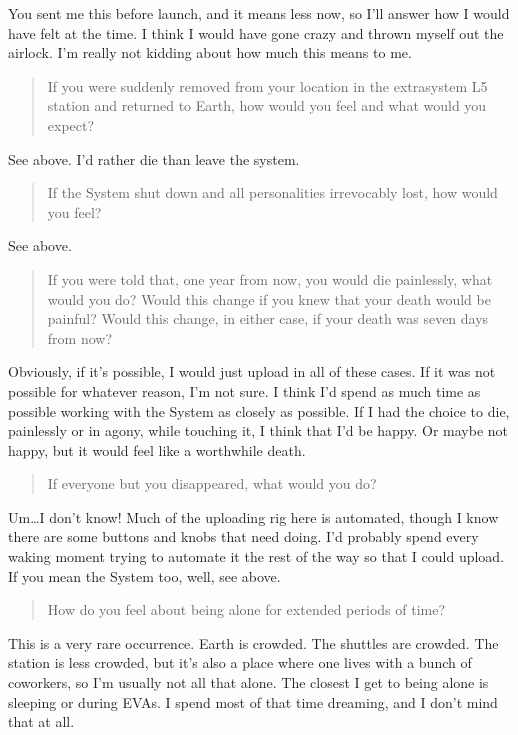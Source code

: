 You sent me this before launch, and it means less now, so I'll answer how I would have felt at the time. I think I would have gone crazy and thrown myself out the airlock. I'm really not kidding about how much this means to me.

\begin{quote}
If you were suddenly removed from your location in the extrasystem L5 station and returned to Earth, how would you feel and what would you expect?
\end{quote}

See above. I'd rather die than leave the system.

\begin{quote}
If the System shut down and all personalities irrevocably lost, how would you feel?
\end{quote}

See above.

\begin{quote}
If you were told that, one year from now, you would die painlessly, what would you do? Would this change if you knew that your death would be painful? Would this change, in either case, if your death was seven days from now?
\end{quote}

Obviously, if it's possible, I would just upload in all of these cases. If it was not possible for whatever reason, I'm not sure. I think I'd spend as much time as possible working with the System as closely as possible. If I had the choice to die, painlessly or in agony, while touching it, I think that I'd be happy. Or maybe not happy, but it would feel like a worthwhile death.

\begin{quote}
If everyone but you disappeared, what would you do?
\end{quote}

Um\ldots I don't know! Much of the uploading rig here is automated, though I know there are some buttons and knobs that need doing. I'd probably spend every waking moment trying to automate it the rest of the way so that I could upload. If you mean the System too, well, see above.

\begin{quote}
How do you feel about being alone for extended periods of time?
\end{quote}

This is a very rare occurrence. Earth is crowded. The shuttles are crowded. The station is less crowded, but it's also a place where one lives with a bunch of coworkers, so I'm usually not all that alone. The closest I get to being alone is sleeping or during EVAs. I spend most of that time dreaming, and I don't mind that at all.

